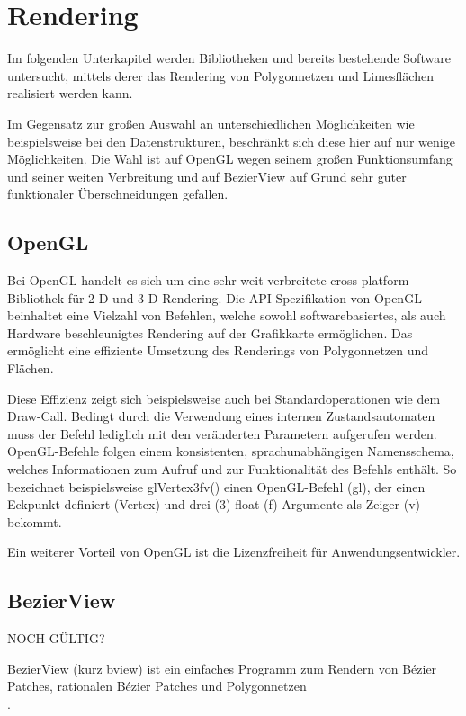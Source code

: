 \section{Rendering}

Im folgenden Unterkapitel werden Bibliotheken und bereits bestehende Software untersucht, mittels derer das Rendering von Polygonnetzen und Limesflächen realisiert werden kann.

Im Gegensatz zur großen Auswahl an unterschiedlichen Möglichkeiten wie beispielsweise bei den Datenstrukturen, beschränkt sich diese hier auf nur wenige Möglichkeiten. Die Wahl ist auf OpenGL wegen seinem großen Funktionsumfang und seiner weiten Verbreitung und auf BezierView auf Grund sehr guter funktionaler Überschneidungen gefallen.


\subsection{OpenGL}

Bei OpenGL handelt es sich um eine sehr weit verbreitete cross-platform Bibliothek für 2-D und 3-D Rendering.
Die API-Spezifikation von OpenGL beinhaltet eine Vielzahl von Befehlen, welche sowohl softwarebasiertes, als auch Hardware beschleunigtes Rendering auf der Grafikkarte ermöglichen. Das ermöglicht eine effiziente Umsetzung des Renderings von Polygonnetzen und Flächen.

Diese Effizienz zeigt sich beispielsweise auch bei Standardoperationen wie dem Draw-Call. Bedingt durch die Verwendung eines internen Zustandsautomaten muss der Befehl lediglich mit den veränderten Parametern aufgerufen werden. OpenGL-Befehle folgen einem konsistenten, sprachunabhängigen Namensschema, welches Informationen zum Aufruf und zur Funktionalität des Befehls enthält. So bezeichnet beispielsweise glVertex3fv() einen OpenGL-Befehl (gl), der einen Eckpunkt definiert (Vertex) und drei (3) float (f) Argumente als Zeiger (v) bekommt.

Ein weiterer Vorteil von OpenGL ist die Lizenzfreiheit für Anwendungsentwickler.

\subsection{BezierView}

NOCH GÜLTIG?

BezierView (kurz bview) ist ein einfaches Programm zum Rendern von Bézier Patches, rationalen Bézier Patches und Polygonnetzen 
\\\cite{Peters.bview.27.07.2015}.

